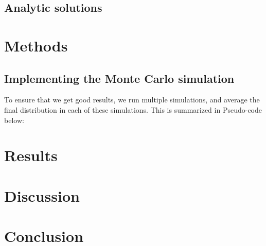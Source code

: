 \documentclass[a4paper, 10pt]{article}
\begin{document}
\subsection{Analytic solutions}

\section{Methods}
\subsection{Implementing the Monte Carlo simulation}
To ensure that we get good results, we run multiple simulations, and average the final distribution in each of these simulations. This is summarized in Pseudo-code below:

\section{Results}
\section{Discussion}
\section{Conclusion}
\end{document}
